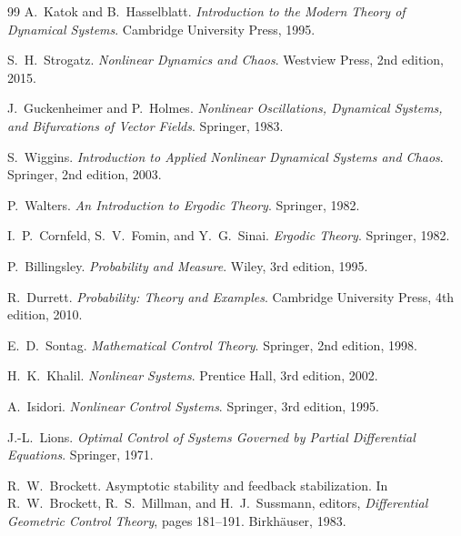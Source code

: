 \documentclass[12pt,openany]{book}
\begin{document}
\begin{thebibliography}{99}
A.~Katok and B.~Hasselblatt.
\newblock \textit{Introduction to the Modern Theory of Dynamical Systems}.
\newblock Cambridge University Press, 1995.

S.~H.~Strogatz.
\newblock \textit{Nonlinear Dynamics and Chaos}.
\newblock Westview Press, 2nd edition, 2015.

J.~Guckenheimer and P.~Holmes.
\newblock \textit{Nonlinear Oscillations, Dynamical Systems, and Bifurcations
  of Vector Fields}.
\newblock Springer, 1983.

S.~Wiggins.
\newblock \textit{Introduction to Applied Nonlinear Dynamical Systems and
  Chaos}.
\newblock Springer, 2nd edition, 2003.

P.~Walters.
\newblock \textit{An Introduction to Ergodic Theory}.
\newblock Springer, 1982.

I.~P.~Cornfeld, S.~V.~Fomin, and Y.~G.~Sinai.
\newblock \textit{Ergodic Theory}.
\newblock Springer, 1982.

P.~Billingsley.
\newblock \textit{Probability and Measure}.
\newblock Wiley, 3rd edition, 1995.

R.~Durrett.
\newblock \textit{Probability: Theory and Examples}.
\newblock Cambridge University Press, 4th edition, 2010.

E.~D.~Sontag.
\newblock \textit{Mathematical Control Theory}.
\newblock Springer, 2nd edition, 1998.

H.~K.~Khalil.
\newblock \textit{Nonlinear Systems}.
\newblock Prentice Hall, 3rd edition, 2002.

A.~Isidori.
\newblock \textit{Nonlinear Control Systems}.
\newblock Springer, 3rd edition, 1995.

J.-L.~Lions.
\newblock \textit{Optimal Control of Systems Governed by Partial Differential
  Equations}.
\newblock Springer, 1971.

R.~W.~Brockett.
\newblock Asymptotic stability and feedback stabilization.
\newblock In R.~W.~Brockett, R.~S.~Millman, and H.~J.~Sussmann, editors,
  \textit{Differential Geometric Control Theory}, pages 181--191.
\newblock Birkh\"{a}user, 1983.


\end{thebibliography}
\end{document}
